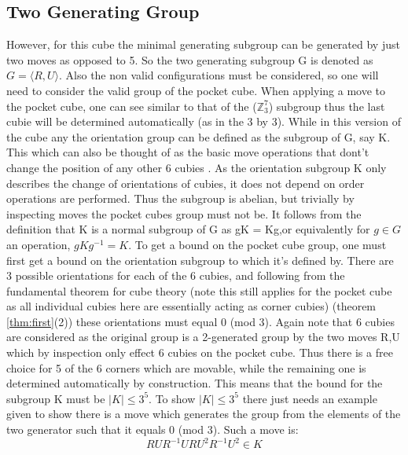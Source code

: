 \documentclass{article}
\newcounter{theo}[section]\setcounter{theo}{0}
\newcounter{lem}[section]\setcounter{lem}{0}
\begin{document}
\subsection{Two Generating Group}

However, for this cube the minimal generating subgroup can be generated by just two moves as opposed to 5. So the two generating subgroup G is denoted as $G = \langle R, U\rangle$. Also the non valid configurations must be considered, so one will need to consider the valid group of the pocket cube. When applying a move to the pocket cube, one can see similar to that of the ($\mathbb{Z}_{3}^{7}$) subgroup thus the last cubie will be determined automatically (as in the 3 by 3). While in this version of the cube any the orientation group can be defined as the subgroup of G, say K. This which can also be thought of as the basic move operations that dont't change the position of any other 6 cubies \cite{bump2006unravelling}. As the orientation subgroup K only describes the change of orientations of cubies, it does not depend on order operations are performed. Thus the subgroup is abelian, but trivially by inspecting moves the pocket cubes group must not be. It follows from the definition that K is a normal subgroup of G as gK = Kg,or equivalently for $g \in G$ an operation, $gKg^{-1} = K$. To get a bound on the pocket cube group, one must first get a bound on the orientation subgroup to which it's defined by. There are 3 possible orientations for each of the 6 cubies, and following from  the fundamental theorem for cube theory (note this still applies for the pocket cube as all individual cubies here are essentially acting as corner cubies) (theorem \ref{thm:first}(2)) these orientations must equal 0 (mod 3). Again note that 6 cubies are considered as the original group is a 2-generated group by the two moves R,U which by inspection only effect 6 cubies on the pocket cube. Thus there is a free choice for 5 of the 6 corners which are movable, while the remaining one is determined automatically by construction. This means that the bound for the subgroup K must be $|K| \leq 3^5$. To show $|K| \leq 3^5$ there just needs an example given to show there is a move which generates the group from the elements of the two generator such that it equals 0 (mod 3). Such a move is:
\begin{equation}
RUR^{-1}URU^{2}R^{-1}U^{2} \in K
\end{equation}

\newcommand{\changecorner}{[Orient 3 Corner],R,U,Rp,U,R,U2,Rp,U2}%
\newcommand{\changecornerarrow}{$\quad\overrightarrow{\strut\textsc{Orienting the corner}}\quad$}
\end{document}
